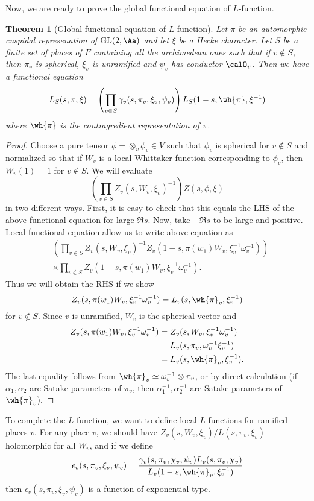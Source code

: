 \documentclass{article}
\newtheorem{theorem}{Theorem}[section]
\newcommand{\GL}{\mathrm{GL}}
\begin{document}
Now, we are ready to prove the global functional equation of $L$-function. 
\begin{theorem}[Global functional equation of $L$-function]
Let $\pi$ be an automorphic cuspidal represenation of $\GL(2, \Aa)$ and let $\xi$ be a Hecke character. 
Let $S$ be a finite set of places of $F$ containing all the archimedean ones such that if $v\not\in S$, then $\pi_{v}$ is spherical, $\xi_{v}$ is unramified and $\psi_{v}$ has conductor $\calO_{v}$. 
Then we have a functional equation
$$
L_{S}(s, \pi, \xi) = \left( \prod_{v\in S} \gamma_{v}(s, \pi_{v}, \xi_{v}, \psi_{v})\right) L_{S}(1-s, \wh{\pi}, \xi^{-1})
$$
where $\wh{\pi}$ is the contragredient representation of $\pi$. 
\end{theorem}
\begin{proof}
Choose a pure tensor $\phi = \otimes_{v}\phi_{v}\in V$ such that $\phi_{v}$ is spherical for $v\not\in S$ and normalized so that if $W_{v}$ is a local Whittaker function corresponding to $\phi_{v}$, then $W_{v}(1) =1$ for $v\not\in S$. 
We will evaluate 
$$
\left( \prod_{v\in S} Z_{v}(s, W_{v}, \xi_{v})^{-1} \right) Z(s, \phi, \xi)
$$ 
in two different ways. 
First, it is easy to check that this equals the LHS of the above functional equation for large $\Re s$. 
Now, take $-\Re s$ to be large and positive. 
Local functional equation allow us to write above equation as
\begin{align*}
&\left(\prod_{v\in S} Z_{v}(s, W_{v}, \xi_{v})^{-1}Z_{v}(1-s, \pi(w_{1})W_{v}, \xi_{v}^{-1}\omega_{v}^{-1})\right) \\
&\times \prod_{v\not\in S} Z_{v}(1-s, \pi(w_{1})W_{v}, \xi_{v}^{-1}\omega_{v}^{-1}). 
\end{align*}
Thus we will obtain the RHS if we show 
$$
Z_{v}(s, \pi(w_{1})W_{v}, \xi_{v}^{-1}\omega_{v}^{-1}) = L_{v}(s, \wh{\pi}_{v}, \xi_{v}^{-1})
$$
for $v\not\in S$. 
Since $v$ is unramified, $W_{v}$ is the spherical vector and 
\begin{align*}
Z_{v}(s, \pi(w_{1})W_{v}, \xi_{v}^{-1}\omega_{v}^{-1}) &= Z_{v}(s, W_{v}, \xi_{v}^{-1}\omega_{v}^{-1})\\
&= L_{v}(s, \pi_{v}, \omega_{v}^{-1}\xi_{v}^{-1}) \\
&= L_{v}(s, \wh{\pi}_{v}, \xi_{v}^{-1}).
\end{align*}
The last equality follows from $\wh{\pi}_{v} \simeq \omega_{v}^{-1} \otimes  \pi_{v}$, or by direct calculation (if $\alpha_1, \alpha_2$ are Satake parameters of $\pi_v$, then $\alpha_1^{-1}, \alpha_{2}^{-1}$ are Satake parameters of $\wh{\pi}_v$). 
\end{proof}
To complete the $L$-function, we want to define local $L$-functions for ramified places $v$. 
For any place $v$, we should have $Z_{v}(s, W_{v}, \xi_{v}) / L(s, \pi_v, \xi_v)$ holomorphic for all $W_v$, and if we define 
$$
\epsilon_{v}(s, \pi_v, \xi_v, \psi_v) = \frac{\gamma_v(s, \pi_v, \chi_v, \psi_v)L_v(s, \pi_v, \chi_v)}{L_v(1-s, \wh{\pi}_v, \xi_{v}^{-1})}
$$
then $\epsilon_v(s, \pi_v, \xi_v, \psi_v)$ is a function of exponential type. 
\end{document}
